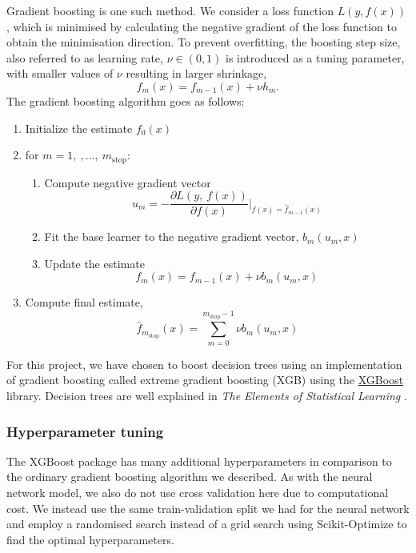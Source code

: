 \documentclass[a4paper, 11pt, twocolumn]{article}
\begin{document}
Gradient boosting is one such method. We consider a loss function $L(y, f(x))$,
which is minimised by calculating the negative gradient of the loss
function to obtain the minimisation direction. To prevent overfitting, the
boosting step size, also referred to as learning rate, $\nu \in (0,1)$ is 
introduced as a tuning parameter, with smaller values of $\nu$ resulting in 
larger shrinkage,  
\begin{equation}
f_m(x)=f_{m-1}(x) + \nu h_m .
\end{equation}
The gradient boosting algorithm goes as follows: \cite{RiccardoGB}
\begin{enumerate}[leftmargin=5mm, itemsep=0pt,  parsep=1pt]
\item Initialize the estimate $f_0(x)$
\item for $m= 1,\ ,\dots,\ m_\text{stop}$:
      \begin{enumerate}[leftmargin=5mm, itemsep=0pt,  parsep=1pt]
            \item Compute negative gradient vector
            \begin{equation*}
                  u_m = -\frac{\partial L(y,\ f(x))}{\partial f(x)} \bigg\vert
                  _{f(x)=\hat{f}_{m-1}(x)}
            \end{equation*}
            \item Fit the base learner to the negative gradient vector,
            $b_m(u_m, x)$
            \item Update the estimate
            \begin{equation*}
                  f_m(x) = f_{m-1}(x) + \nu b_m (u_m, x)
            \end{equation*}
      \end{enumerate}
\item Compute final estimate,
      \begin{equation*}
            \hat{f}_{m_\text{stop}} (x) =
            \sum _{m=0}^{m_\text{stop}-1}\nu b_m(u_m, x)
      \end{equation*}
\end{enumerate}

For this project, we have chosen to boost decision trees using an implementation 
of gradient boosting called extreme gradient boosting (XGB) using the 
\href{https://github.com/dmlc/xgboost}{XGBoost} library. Decision trees are 
well explained in \textit{The Elements of Statistical Learning} 
\cite[chapter 9.2]{hastie}.

\subsubsection{Hyperparameter tuning}
The XGBoost package has many additional hyperparameters in comparison to the 
ordinary gradient boosting algorithm we described. 
As with the neural network model, we also do not use cross validation here due 
to computational cost. We instead use the same train-validation split we had for 
the neural network and employ a randomised search instead of a grid search using 
Scikit-Optimize to find the optimal hyperparameters. 
\end{document}

